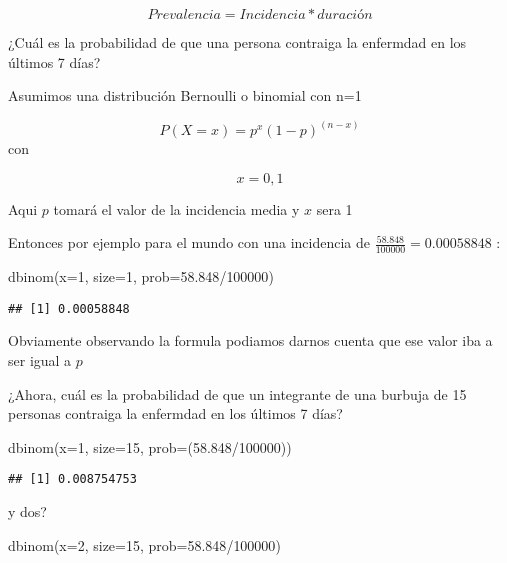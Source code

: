 \documentclass[
]{article}
\newenvironment{Shaded}{\begin{snugshade}}{\end{snugshade}}
\newcommand{\AttributeTok}[1]{\textcolor[rgb]{0.77,0.63,0.00}{#1}}
\newcommand{\DecValTok}[1]{\textcolor[rgb]{0.00,0.00,0.81}{#1}}
\newcommand{\FloatTok}[1]{\textcolor[rgb]{0.00,0.00,0.81}{#1}}
\newcommand{\FunctionTok}[1]{\textcolor[rgb]{0.00,0.00,0.00}{#1}}
\newcommand{\NormalTok}[1]{#1}
\newcommand{\SpecialCharTok}[1]{\textcolor[rgb]{0.00,0.00,0.00}{#1}}
\begin{document}
\[ Prevalencia  = Incidencia* duración\]

¿Cuál es la probabilidad de que una persona contraiga la enfermdad en
los últimos 7 días?

Asumimos una distribución Bernoulli o binomial con n=1

\[P(X=x)=p^x (1-p)^{(n-x)}\] con

\[𝑥={0,1}\]

Aqui \(p\) tomará el valor de la incidencia media y \(x\) sera 1

Entonces por ejemplo para el mundo con una incidencia de
\(\frac{58.848}{100000}=0.00058848\) :

\begin{Shaded}
\begin{Highlighting}[]
\FunctionTok{dbinom}\NormalTok{(}\AttributeTok{x=}\DecValTok{1}\NormalTok{, }\AttributeTok{size=}\DecValTok{1}\NormalTok{, }\AttributeTok{prob=}\FloatTok{58.848}\SpecialCharTok{/}\DecValTok{100000}\NormalTok{)}
\end{Highlighting}
\end{Shaded}

\begin{verbatim}
## [1] 0.00058848
\end{verbatim}

Obviamente observando la formula podiamos darnos cuenta que ese valor
iba a ser igual a \(p\)

¿Ahora, cuál es la probabilidad de que un integrante de una burbuja de
15 personas contraiga la enfermdad en los últimos 7 días?

\begin{Shaded}
\begin{Highlighting}[]
\FunctionTok{dbinom}\NormalTok{(}\AttributeTok{x=}\DecValTok{1}\NormalTok{, }\AttributeTok{size=}\DecValTok{15}\NormalTok{, }\AttributeTok{prob=}\NormalTok{(}\FloatTok{58.848}\SpecialCharTok{/}\DecValTok{100000}\NormalTok{))}
\end{Highlighting}
\end{Shaded}

\begin{verbatim}
## [1] 0.008754753
\end{verbatim}

y dos?

\begin{Shaded}
\begin{Highlighting}[]
\FunctionTok{dbinom}\NormalTok{(}\AttributeTok{x=}\DecValTok{2}\NormalTok{, }\AttributeTok{size=}\DecValTok{15}\NormalTok{, }\AttributeTok{prob=}\FloatTok{58.848}\SpecialCharTok{/}\DecValTok{100000}\NormalTok{)}
\end{Highlighting}
\end{Shaded}
\end{document}
